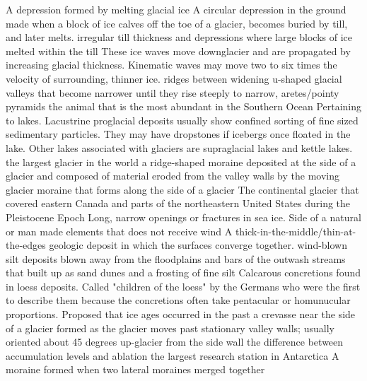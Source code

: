  A depression formed by melting glacial ice
 A circular depression in the ground made when a block of ice calves off the toe of a glacier, becomes buried by till, and later melts.
 irregular till thickness and depressions where large blocks of ice melted within the till
 These ice waves move downglacier and are propagated by increasing glacial thickness. Kinematic waves may move two to six times the velocity of surrounding, thinner ice.
 ridges between widening u-shaped glacial valleys that become narrower until they rise steeply to narrow, aretes/pointy pyramids
 the animal that is the most abundant in the Southern Ocean
 Pertaining to lakes. Lacustrine proglacial deposits usually show confined sorting of fine sized sedimentary particles. They may have dropstones if icebergs once floated in the lake. Other lakes associated with glaciers are supraglacial lakes and kettle lakes.
 the largest glacier in the world
 a ridge-shaped moraine deposited at the side of a glacier and composed of material eroded from the valley walls by the moving glacier
 moraine that forms along the side of a glacier
 The continental glacier that covered eastern Canada and parts of the northeastern United States during the Pleistocene Epoch
 Long, narrow openings or fractures in sea ice.
 Side of a natural or man made elements that does not receive wind
 A thick-in-the-middle/thin-at-the-edges geologic deposit in which the surfaces converge together.
 wind-blown silt deposits blown away from the floodplains and bars of the outwash streams that built up as sand dunes and a frosting of fine silt
 Calcarous concretions found in loess deposits. Called "children of the loess" by the Germans who were the first to describe them because the concretions often take pentacular or homunucular proportions.
 Proposed that ice ages occurred in the past
 a crevasse near the side of a glacier formed as the glacier moves past stationary valley walls; usually oriented about 45 degrees up-glacier from the side wall
 the difference between accumulation levels and ablation
 the largest research station in Antarctica
 A moraine formed when two lateral moraines merged together
